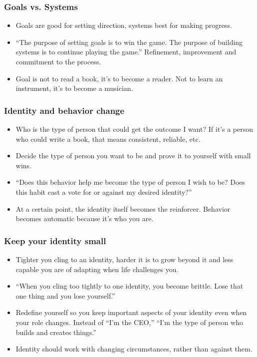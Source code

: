 \begin{frame}[fragile]\frametitle{Goals vs. Systems}

\begin{itemize}
\item Goals are good for setting direction, systems best for making progress. 
\item ``The purpose of setting goals is to win the game. The purpose of building systems is to continue playing the game.” Refinement, improvement and commitment to the process. 
\item Goal is not to read a book, it’s to become a reader. Not to learn an instrument, it’s to become a musician. 
\end{itemize}
\end{frame}

\begin{frame}[fragile]\frametitle{Identity and behavior change}

\begin{itemize}
\item Who is the type of person that could get the outcome I want? If it’s a person who could write a book, that means consistent, reliable, etc. 
\item Decide the type of person you want to be and prove it to yourself with small wins. 
\item ``Does this behavior help me become the type of person I wish to be? Does this habit cast a vote for or against my desired identity?'' 
\item At a certain point, the identity itself becomes the reinforcer. Behavior becomes automatic because it’s who you are.  
\end{itemize}
\end{frame}

\begin{frame}[fragile]\frametitle{Keep your identity small}
\begin{itemize}
\item Tighter you cling to an identity, harder it is to grow beyond it and less capable you are of adapting when life challenges you. 
\item ``When you cling too tightly to one identity, you become brittle. Lose that one thing and you lose yourself.” 
\item Redefine yourself so you keep important aspects of your identity even when your role changes. Instead of ``I’m the CEO,” ``I’m the type of person who builds and creates things.'' 
\item Identity should work with changing circumstances, rather than against them.  
\end{itemize}
\end{frame}

